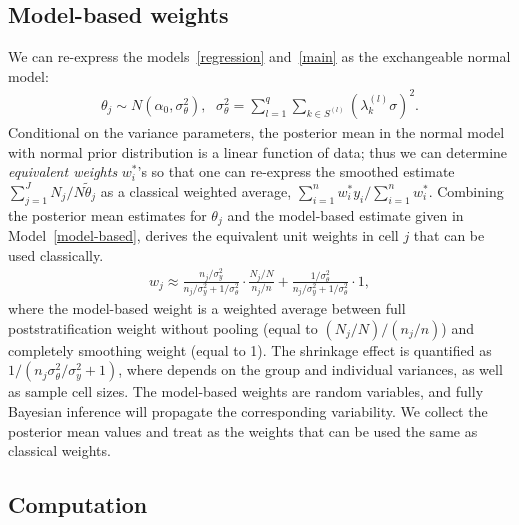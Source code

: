 \documentclass[11pt]{article}
\numberwithin{figure}{section}
\numberwithin{table}{section}
\numberwithin{equation}{section}
\begin{document}
\subsection{Model-based weights}

We can re-express the models~\eqref{regression} and~\eqref{main} as the
exchangeable normal model:	\begin{align} \label{theta-summary} \theta_j \sim
  N(\alpha_0, \sigma^2_{\theta})\mbox{, } \ \
  \sigma^2_{\theta}=\sum_{l=1}^q\sum_{k\in S^{(l)}}(\lambda_k^{(l)}\sigma)^2.
  \end{align} Conditional on the variance parameters, the posterior mean in the
  normal model with normal prior distribution is a linear function of data;
  thus we can determine {\em equivalent weights} $w^*_i$'s so that one can
  re-express the smoothed estimate $\sum_{j=1}^JN_j/N\tilde{\theta}_j$ as a
  classical weighted average, $\sum_{i=1}^n w^*_iy_i/\sum_{i=1}^n w^*_i$.
  Combining the posterior mean estimates for $\theta_j$ and the model-based
  estimate given in Model~\eqref{model-based}, \cite{gelman07} derives the
  equivalent unit weights in cell $j$ that can be used classically.
  \begin{align} \label{model-w} w_j\approx
  \frac{n_j/\sigma^2_y}{n_j/\sigma^2_y+1/\sigma_{\theta}^2}\cdot\frac{N_j/N}{n_j/n}
  +  \frac{1/\sigma^2_{\theta}}{n_j/	\sigma^2_y+1/\sigma_{\theta}^2} \cdot 1,
  \end{align} where the model-based weight is a weighted average between full
  poststratification weight without pooling (equal to $(N_j/N)/(n_j/n)$) and
  completely smoothing weight (equal to 1). The shrinkage effect is quantified
  as $1/(n_j\sigma^2_{\theta}/	\sigma^2_y	+1)$, where depends on the group
  and individual variances, as well as sample cell sizes. The model-based
  weights are random variables, and fully Bayesian inference will propagate the
  corresponding variability. We collect the posterior mean values and treat as
  the weights that can be used the same as classical weights.

\subsection{Computation}
\end{document}

